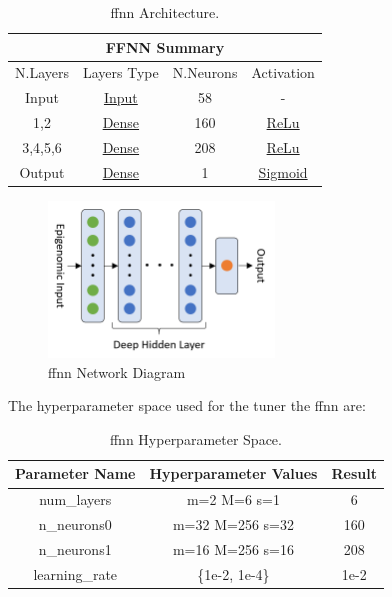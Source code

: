 \documentclass{article}
\begin{document}
\begin{table}[!ht]
\begin{center}
\begin{tabular}{ |c|c|c|c| }
 \hline
 \multicolumn{4}{|c|}{FFNN Summary} \\
 \hline
    N.Layers & Layers Type & N.Neurons & Activation\\
 \hline 
    Input & \href{https://www.tensorflow.org/api_docs/python/tf/keras/layers/InputLayer}{Input} & 58 & - \\
    1,2 & \href{https://www.tensorflow.org/api_docs/python/tf/keras/layers/InputLayer}{Dense} & 160 &   \href{https://www.tensorflow.org/api_docs/python/tf/keras/layers/ReLU}{ReLu}\\
    3,4,5,6 &   \href{https://www.tensorflow.org/api_docs/python/tf/keras/layers/InputLayer}{Dense} & 208 &   \href{https://www.tensorflow.org/api_docs/python/tf/keras/layers/ReLU}{ReLu}\\
    Output  &   \href{https://www.tensorflow.org/api_docs/python/tf/keras/layers/InputLayer}{Dense} & 1 &   \href{https://www.tensorflow.org/api_docs/python/tf/keras/activations/sigmoid}{Sigmoid}\\
 \hline
\end{tabular}
\caption{\label{tab:FFNN_Summary} \acrshort{ffnn}  Architecture.}
\end{center}
\end{table}

\begin{figure}[!ht]
    \centering
    \includegraphics[width=6cm]{image/FFNN_Diagram.PNG}
    \caption{\acrshort{ffnn} Network Diagram}
    \label{fig:FFNN_Diagram}
\end{figure}

\centerline{The hyperparameter space used for the tuner the \acrshort{ffnn} are:}

\begin{table}[!ht]
\begin{center}
\begin{tabular}{||c | c | c ||} 
 \hline
 Parameter Name & Hyperparameter Values & Result\\ [0.5ex] 
 \hline\hline
 num\_layers & \acrshort{m}=2 \acrshort{M}=6 \acrshort{s}=1 & 6 \\ 
 \hline
 n\_neurons0 & \acrshort{m}=32 \acrshort{M}=256 \acrshort{s}=32 & 160 \\
 \hline
 n\_neurons1 & \acrshort{m}=16 \acrshort{M}=256 \acrshort{s}=16 & 208\\
 \hline
 learning\_rate & \{1e-2, 1e-4\} & 1e-2\\
 \hline
\end{tabular}
\caption{\label{tab:FFNN_Hyperparameter} \acrshort{ffnn} Hyperparameter Space.}
\end{center}
\end{table}
\end{document}
